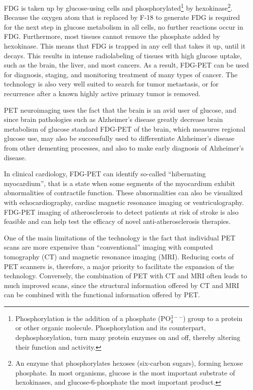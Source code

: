 FDG is taken up by glucose-using cells and phosphorylated\footnote{Phosphorylation is the addition of a phosphate (PO$_4^{3--}$) group to a protein or other organic molecule. Phosphorylation and its counterpart, dephosphorylation, turn many protein enzymes on and off, thereby altering their function and activity.} by hexokinase\footnote{An enzyme that phosphorylates hexoses (six-carbon sugars), forming hexose phosphate. In most organisms, glucose is the most important substrate of hexokinases, and glucose-6-phosphate the most important product.}. Because the oxygen atom that is replaced by F-18 to generate FDG is required for the next step in glucose metabolism in all cells, no further reactions occur in FDG. Furthermore, most tissues cannot remove the phosphate added by hexokinase. This means that FDG is trapped in any cell that takes it up, until it decays. This results in intense radiolabeling of tissues with high glucose uptake, such as the brain, the liver, and most cancers. As a result, FDG-PET can be used for diagnosis, staging, and monitoring treatment of many types of cancer. The technology is also very well suited to search for tumor metastasis, or for recurrence after a known highly active primary tumor is removed. 

PET neuroimaging uses the fact that the brain is an avid user of glucose, and since brain pathologies such as Alzheimer's disease greatly decrease brain metabolism of glucose standard FDG-PET of the brain, which measures regional glucose use, may also be successfully used to differentiate Alzheimer's disease from other dementing processes, and also to make early diagnosis of Alzheimer's disease. 

In clinical cardiology, FDG-PET can identify so-called ``hibernating myocardium'', that is a state when some segments of the myocardium exhibit abnormalities of contractile function. These abnormalities can also be visualized with echocardiography, cardiac magnetic resonance imaging or ventriculography. FDG-PET imaging of atherosclerosis to detect patients at risk of stroke is also feasible and can help test the efficacy of novel anti-atherosclerosis therapies.

One of the main limitations of the technology is the fact that  individual PET scans are more expensive than ``conventional'' imaging with computed tomography (CT) and magnetic resonance imaging (MRI). Reducing costs of PET scanners is, therefore, a major priority to facilitate the expansion of the technology. Conversely, the combination of PET with CT and MRI often leads to much improved scans, since the structural information offered by CT and MRI can be combined with the functional information offered by PET. 

